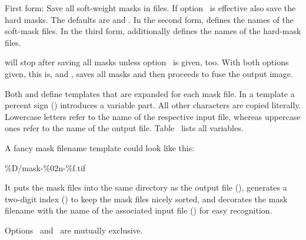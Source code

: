 \begin{codelist}
    \begin{sloppypar}
      First form: Save all soft-weight masks in files.  If
      option~ is effective also save the hard
      masks.  The defaults are
       and
      . In the second form,
       defines the names of the
      soft-mask files.  In the third form,
       additionally defines the
      names of the hard-mask files.
    \end{sloppypar}

    \App{} will stop after saving all masks unless
    option~ is given, too.  With both options given,
    this is,  and , \App{} saves
    all masks and then proceeds to fuse the output image.

    Both  and
     define templates that are
    expanded for each mask file.  In a template a percent sign
    (\sample{\%}) introduces a variable part.  All other characters
    are copied literally.  Lowercase letters refer to the name of the
    respective input file, whereas uppercase ones refer to the name of
    the output file.  Table~
    lists all variables.

    A fancy mask filename template could look like this:
    \begin{literal}
      \%D/mask-\%02n-\%f.tif
    \end{literal}
    It puts the mask files into the same directory as the output file
    (), generates a two-digit index () to
    keep the mask files nicely sorted, and decorates the mask filename
    with the name of the associated input file () for easy
    recognition.

    Options~ and~ are
    mutually exclusive.
\fi
\end{codelist}


\ifenfuse
  
\fi

